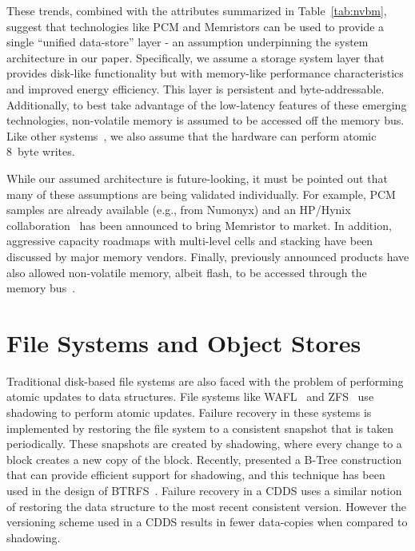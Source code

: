 These trends, combined with the attributes summarized in
Table~\ref{tab:nvbm}, suggest that technologies like PCM and
Memristors can be used to provide a single ``unified data-store''
layer - an assumption underpinning the system architecture in our
paper. Specifically, we assume a storage system layer that provides
disk-like functionality but with memory-like performance
characteristics and improved energy efficiency.  This layer is
persistent and byte-addressable. Additionally, to best take advantage
of the low-latency features of these emerging technologies,
non-volatile memory is assumed to be accessed off the memory bus.
Like other systems~\citep{Coburn09,Condit09}, we also assume that the
hardware can perform atomic 8~byte writes.

While our assumed architecture is future-looking, it must be pointed
out that many of these assumptions are being validated individually.
For example, PCM samples are already available (e.g., from
Numonyx) and an HP/Hynix collaboration~\citep{HpHynix10} has been announced 
to bring Memristor to market.  In addition, aggressive capacity roadmaps 
with multi-level cells and stacking have been discussed by major memory
vendors.  Finally, previously announced products have also allowed non-volatile
memory, albeit flash, to be accessed through the memory
bus~\citep{Spansion08}.

\section{File Systems and Object Stores} 

Traditional disk-based file systems are also faced with the problem of
performing atomic updates to data structures.  File systems like
WAFL~\citep{Hitz94} and ZFS~\citep{ZFS} use shadowing to perform atomic
updates.  Failure recovery in these systems is implemented by restoring
the file system to a consistent snapshot that is taken periodically.  
These snapshots are created by shadowing, where every change to a block
creates a new copy of the block.  Recently, \citet{Rodeh08} presented a
B-Tree construction that can provide efficient support for shadowing, and
this technique has been used in the design of BTRFS~\citep{BTRFS}.
Failure recovery in a CDDS uses a similar notion of restoring the data
structure to the most recent consistent version.  However the versioning
scheme used in a CDDS results in fewer data-copies when compared to shadowing.

